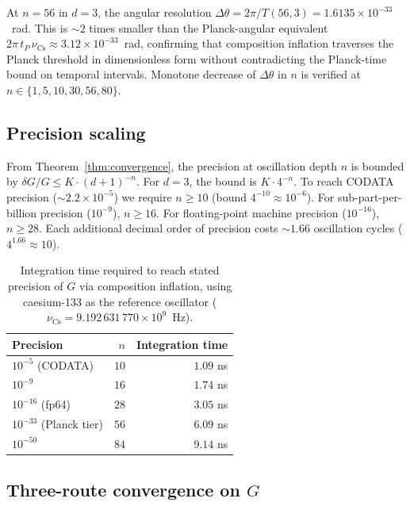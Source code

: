 \documentclass[11pt,twocolumn,a4paper]{article}
\theoremstyle{definition}
\theoremstyle{remark}
\newcommand{\Gnewton}{G}
\begin{document}
At $n = 56$ in $d = 3$, the angular resolution $\Delta\theta = 2\pi / T(56, 3) = 1.6135\times 10^{-33}$~rad. This is $\sim 2$ times smaller than the Planck-angular equivalent $2\pi\,t_P\,\nu_{\mathrm{Cs}} \approx 3.12\times 10^{-33}$~rad, confirming that composition inflation traverses the Planck threshold in dimensionless form without contradicting the Planck-time bound on temporal intervals. Monotone decrease of $\Delta\theta$ in $n$ is verified at $n \in \{1, 5, 10, 30, 56, 80\}$.

\subsection{Precision scaling}

From Theorem~\ref{thm:convergence}, the precision at oscillation depth $n$ is bounded by $\delta\Gnewton / \Gnewton \leq K\cdot (d+1)^{-n}$. For $d = 3$, the bound is $K \cdot 4^{-n}$. To reach CODATA precision ($\sim 2.2\times 10^{-5}$) we require $n \geq 10$ (bound $4^{-10}\approx 10^{-6}$). For sub-part-per-billion precision ($10^{-9}$), $n \geq 16$. For floating-point machine precision ($10^{-16}$), $n \geq 28$. Each additional decimal order of precision costs $\sim 1.66$ oscillation cycles ($4^{1.66}\approx 10$).

\begin{table}[H]
\centering\small
\caption{Integration time required to reach stated precision of $\Gnewton$ via composition inflation, using caesium-133 as the reference oscillator ($\nu_\text{Cs} = 9.192\,631\,770\times 10^9$~Hz).}
\begin{tabular}{lrr}
\toprule
\textbf{Precision} & \textbf{$n$} & \textbf{Integration time}\\
\midrule
$10^{-5}$ (CODATA)        & $10$ & $1.09$ ns\\
$10^{-9}$                 & $16$ & $1.74$ ns\\
$10^{-16}$ (fp64)         & $28$ & $3.05$ ns\\
$10^{-33}$ (Planck tier)  & $56$ & $6.09$ ns\\
$10^{-50}$                & $84$ & $9.14$ ns\\
\bottomrule
\end{tabular}
\end{table}

\subsection{Three-route convergence on $\Gnewton$}
\end{document}
